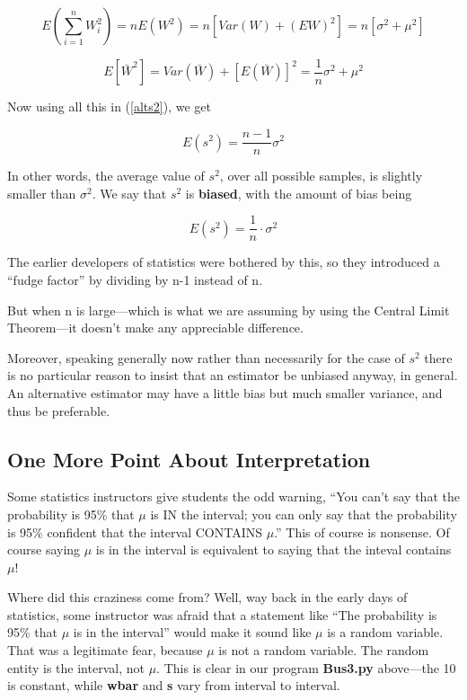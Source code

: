 \begin{equation}
E(\sum_{i=1}^n W_i^2) = n E(W^2) = n[Var(W)+(EW)^2] =
n[\sigma^2 + \mu^2]
\end{equation}

\begin{equation}
E[\bar{W}^2] = Var(\bar{W}) + [E(\bar{W})]^2 = \frac{1}{n} \sigma^2 +
\mu^2
\end{equation}

Now using all this in (\ref{alts2}), we get

\begin{equation}
E(s^2) = \frac{n-1}{n} \sigma^2
\end{equation}

\checkpoint

In other words, the average value of $s^2$, over all possible samples,
is slightly smaller than $\sigma^2$.  We say that $s^2$ is {\bf biased},
with the amount of bias being

\begin{equation}
E(s^2) = \frac{1}{n} \cdot \sigma^2
\end{equation}

The earlier developers of statistics were bothered by this, so they
introduced a ``fudge factor'' by dividing by n-1 instead of n.

But when n is large---which is what we are assuming by using the Central
Limit Theorem---it doesn't make any appreciable difference.  

Moreover, speaking generally now rather than necessarily for the case of
$s^2$ there is no particular reason to insist that an estimator be
unbiased anyway, in general.  An alternative estimator may have a little
bias but much smaller variance, and thus be preferable.

\subsection{One More Point About Interpretation}

Some statistics instructors give students the odd warning, ``You can't
say that the probability is 95\% that $\mu$ is IN the interval; you can
only say that the probability is 95\% confident that the interval
CONTAINS $\mu$.'' This of course is nonsense.  Of course saying $\mu$ is
in the interval is equivalent to saying that the inteval contains $\mu$!

Where did this craziness come from?  Well, way back in the early days of
statistics, some instructor was afraid that a statement like ``The
probability is 95\% that $\mu$ is in the interval'' would make it sound
like $\mu$ is a random variable.  That was a legitimate fear, because
$\mu$ is not a random variable.  The random entity is the interval, not
$\mu$.  This is clear in our program {\bf Bus3.py} above---the 10 is
constant, while {\bf wbar} and {\bf s} vary from interval to interval.  

